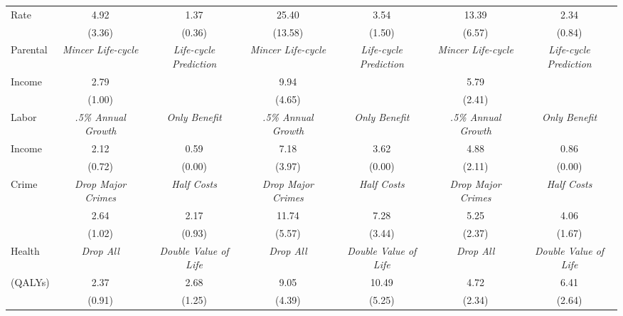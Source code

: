 \begin{tabular}{lcccccc}
Rate	&	4.92	&	1.37	&	25.40	&	3.54	&	13.39	&	2.34	\\
	&	(3.36)	&	(0.36)	&	(13.58)	&	(1.50)	&	(6.57)	&	(0.84)	\\ \midrule
Parental	&	\textit{Mincer Life-cycle}	&	\textit{Life-cycle Prediction}	&	\textit{Mincer Life-cycle}	&	\textit{Life-cycle Prediction}	&	\textit{Mincer Life-cycle}	&	\textit{Life-cycle Prediction}	\\
Income	&	2.79	&		&	9.94	&		&	5.79	&		\\
	&	(1.00)	&		&	(4.65)	&		&	(2.41)	&		\\ \midrule
Labor	&	\textit{.5\% Annual Growth}	&	\textit{Only Benefit}	&	\textit{.5\% Annual Growth}	&	\textit{Only Benefit}	&	\textit{.5\% Annual Growth}	&	\textit{Only Benefit}	\\
Income	&	2.12	&	0.59	&	7.18	&	3.62	&	4.88	&	0.86	\\
	&	(0.72)	&	(0.00)	&	(3.97)	&	(0.00)	&	(2.11)	&	(0.00)	\\ \midrule
Crime	&	\textit{Drop Major Crimes}	&	\textit{Half Costs}	&	\textit{Drop Major Crimes}	&	\textit{Half Costs}	&	\textit{Drop Major Crimes}	&	\textit{Half Costs}	\\
	&	2.64	&	2.17	&	11.74	&	7.28	&	5.25	&	4.06	\\
	&	(1.02)	&	(0.93)	&	(5.57)	&	(3.44)	&	(2.37)	&	(1.67)	\\ \midrule
Health	&	\textit{Drop All}	&	\textit{Double Value of Life}	&	\textit{Drop All}	&	\textit{Double Value of Life}	&	\textit{Drop All}	&	\textit{Double Value of Life}	\\
(QALYs)	&	2.37	&	2.68	&	9.05	&	10.49	&	4.72	&	6.41	\\
	&	(0.91)	&	(1.25)	&	(4.39)	&	(5.25)	&	(2.34)	&	(2.64)	\\ \bottomrule
\end{tabular}